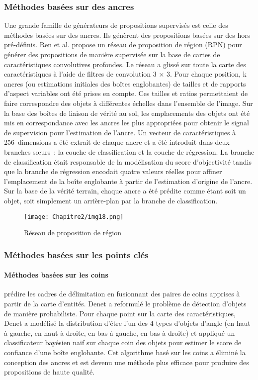           \subsubsection{Méthodes basées sur des ancres}
          Une grande famille de générateurs de propositions supervisés est celle des méthodes basées sur des ancres. Ils génèrent des propositions basées sur des hors pré-définis. Ren et al. propose un réseau de proposition de région (RPN) \cite{rpn_paper} pour générer des propositions de manière supervisée sur la base de cartes de caractéristiques convolutives profondes. Le réseau a glissé sur toute la carte des caractéristiques à l'aide de filtres de convolution 3 × 3. Pour chaque position, k ancres (ou estimations initiales des boîtes englobantes) de tailles et de rapports d'aspect variables ont été prises en compte. Ces tailles et ratios permettaient de faire correspondre des objets à différentes échelles dans l'ensemble de l'image. Sur la base des boîtes de liaison de vérité au sol, les emplacements des objets ont été mis en correspondance avec les ancres les plus appropriées pour obtenir le signal de supervision pour l'estimation de l'ancre. Un vecteur de caractéristiques à 256 dimensions a été extrait de chaque ancre et a été introduit dans deux branches sœurs : la couche de classification et la couche de régression. La branche de classification était responsable de la modélisation du score d'objectivité tandis que la branche de régression encodait quatre valeurs réelles pour affiner l'emplacement de la boîte englobante à partir de l'estimation d'origine de l'ancre. Sur la base de la vérité terrain, chaque ancre a été prédite comme étant soit un objet, soit simplement un arrière-plan par la branche de classification.
          \begin{figure}[H]
               \centering
               \texttt{[image: Chapitre2/img18.png]}
               \caption{Réseau de proposition de région \cite{diagram_overflow}}
               \label{img18}
               \end{figure}

          \subsubsection{Méthodes basées sur les points clés}
          \paragraph{Méthodes basées sur les coins} prédire les cadres de délimitation en fusionnant des paires de coins apprises à partir de la carte d'entités. Denet \cite{denet} a reformulé le problème de détection d'objets de manière probabiliste. Pour chaque point sur la carte des caractéristiques, Denet a modélisé la distribution d'être l'un des 4 types d'objets d'angle (en haut à gauche, en haut à droite, en bas à gauche, en bas à droite) et appliqué un classificateur bayésien naïf sur chaque coin des objets pour estimer le score de confiance d'une boîte englobante. Cet algorithme basé sur les coins a éliminé la conception des ancres et est devenu une méthode plus efficace pour produire des propositions de haute qualité.
